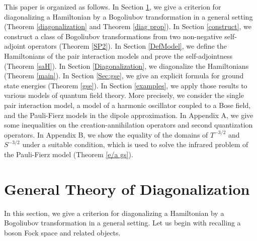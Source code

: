 \documentclass[12pt,draft]{article}
\theoremstyle{plain}
\numberwithin{equation}{section}
\theoremstyle{remark}
\begin{document}

This paper is organized as follows.
In Section \ref{generalD}, we give a criterion for diagonalizing a Hamiltonian by a Bogoliubov 
transformation in a general setting (Theorem \ref{diagonalization} and Theorem \ref{diag prop}).
In Section \ref{construct}, we construct a class of Bogoliubov transformations from two non-negative self-adjoint operators (Theorem \ref{SP2}).
In Section \ref{DefModel}, we define the Hamiltonians of the pair interaction models and prove the self-adjointness (Theorem \ref{saH}).
In Section \ref{Diagonalization}, we diagonalize the Hamiltonians (Theorem \ref{main}). %
In Section \ref{Sec:gse}, we give an explicit formula for ground state energies (Theorem \ref{gse}).
In Section \ref{examples}, we apply those results to various models of quantum field theory. 
More precisely, we consider the single pair interaction model, a model of a harmonic oscillator coupled to a Bose field, and the Pauli-Fierz models in the dipole approximation. 
In Appendix A, we give some inequalities on the creation-annihilation operators and second quantization operators.
In Appendix B, we show the equality of the domains of $T^{-3/2}$ and $S^{-3/2}$ under a suitable condition, 
which is used to solve the infrared problem of the Pauli-Fierz model (Theorem \ref{e/a gs}).


\section{General Theory of Diagonalization}\label{generalD}

In this section, we give a criterion for diagonalizing a Hamiltonian by a Bogoliubov 
transformation in a general setting.
Let us begin with recalling a boson Fock space and related objects.
\end{document}
